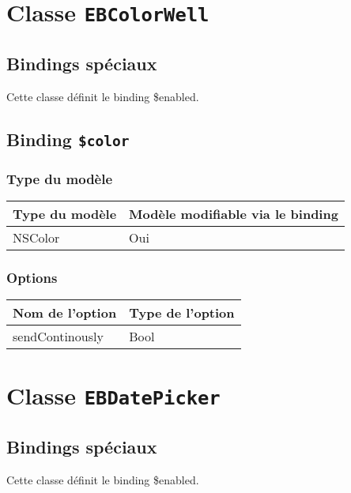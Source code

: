 \section{Classe \texttt{EBColorWell}}

\subsection{Bindings spéciaux}

Cette classe définit le binding \$enabled.

\subsection{Binding \texttt{\$color}}

\subsubsection{Type du modèle}

\begin{tabular}{|l|l|}
\hline
\textbf{Type du modèle} & \textbf{Modèle modifiable via le binding}\\
\hline
NSColor & Oui\\
\hline
\end{tabular}
\subsubsection{Options}

\begin{tabular}{|l|l|}
\hline
\textbf{Nom de l'option} & \textbf{Type de l'option}\\
\hline
sendContinously & Bool\\
\hline
\end{tabular}







\section{Classe \texttt{EBDatePicker}}

\subsection{Bindings spéciaux}

Cette classe définit le binding \$enabled.

